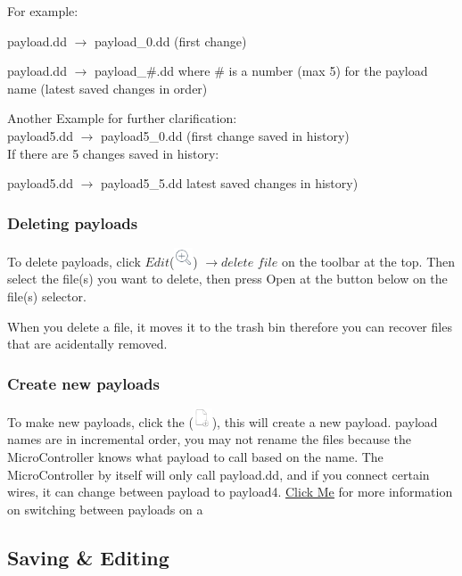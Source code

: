 \documentclass[a4paper,12pt]{article}
\begin{document}
For example:

payload.dd $\rightarrow$ payload\_0.dd (first change)

payload.dd $\rightarrow$ payload\_\#.dd where \# is a number (max 5) for the payload name (latest saved changes in order)

Another Example for further clarification:
\ \\
payload5.dd $\rightarrow$ payload5\_0.dd (first change saved in history)
\ \\
If there are 5 changes saved in history:

payload5.dd $\rightarrow$ payload5\_5.dd  latest saved changes in history)

\subsubsection{Deleting payloads}

To delete payloads, click $Edit$(\includegraphics[width=5.5mm]{pictures/black_bk/view.png}) $ \rightarrow delete$ $file$ on the toolbar at the top. Then select the file(s) you want to delete, then press Open at the button below on the file(s) selector.

When you delete a file, it moves it to the trash bin therefore you can recover files that are acidentally removed.

\subsubsection{Create new payloads}

To make new payloads, click the (\includegraphics[width=5.5mm]{pictures/black_bk/add_file.png}), this will create a new payload. payload names are in incremental order, you may not rename the files because the MicroController knows what payload to call based on the name. The MicroController by itself will only call payload.dd, and if you connect certain wires, it can change between payload to payload4. \href{https://github.com/dbisu/pico-ducky#multiple-payloads}{\underline{Click Me}} for more information on switching between payloads on a 

\subsection{Saving \& Editing}\label{save_edit}
\end{document}
